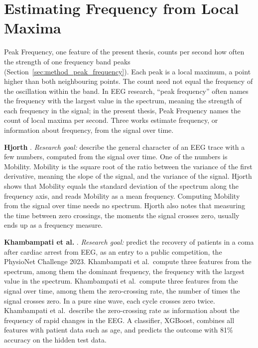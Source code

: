 \documentclass[12pt,a4paper]{report}
\begin{document}
\section{Estimating Frequency from Local Maxima}
\label{sec:lit_peak_frequency}
Peak Frequency, one feature of the present thesis, counts per second how often the strength of one frequency band peaks (Section~\ref{sec:method_peak_frequency}). Each peak is a local maximum, a point higher than both neighbouring points. The count need not equal the frequency of the oscillation within the band. In EEG research, ``peak frequency'' often names the frequency with the largest value in the spectrum, meaning the strength of each frequency in the signal; in the present thesis, Peak Frequency names the count of local maxima per second. Three works estimate frequency, or information about frequency, from the signal over time.

\textbf{Hjorth} \cite{hjorth_eeg_1970}. \emph{Research goal:} describe the general character of an EEG trace with a few numbers, computed from the signal over time. One of the numbers is Mobility. Mobility is the square root of the ratio between the variance of the first derivative, meaning the slope of the signal, and the variance of the signal. Hjorth shows that Mobility equals the standard deviation of the spectrum along the frequency axis, and reads Mobility as a mean frequency. Computing Mobility from the signal over time needs no spectrum. Hjorth also notes that measuring the time between zero crossings, the moments the signal crosses zero, usually ends up as a frequency measure.

\textbf{Khambampati et al.} \cite{khambampati_frequency_2023}. \emph{Research goal:} predict the recovery of patients in a coma after cardiac arrest from EEG, as an entry to a public competition, the PhysioNet Challenge 2023. Khambampati et al.\ compute three features from the spectrum, among them the dominant frequency, the frequency with the largest value in the spectrum. Khambampati et al.\ compute three features from the signal over time, among them the zero-crossing rate, the number of times the signal crosses zero. In a pure sine wave, each cycle crosses zero twice. Khambampati et al.\ describe the zero-crossing rate as information about the frequency of rapid changes in the EEG. A classifier, XGBoost, combines all features with patient data such as age, and predicts the outcome with 81\% accuracy on the hidden test data.
\end{document}
